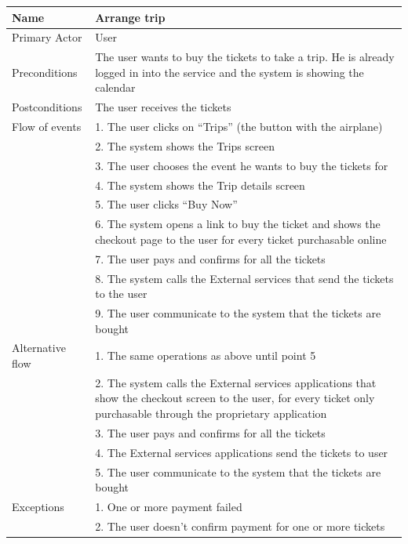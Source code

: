 \begin{center}
\def\arraystretch{1.25}
  \begin{tabular}{ | l | p{} | }
    \hline
    Name & Arrange trip \\ \hline
    Primary Actor & User \\ \hline
    Preconditions & The user wants to buy the tickets to take a trip. He is already logged in into the service and the system is showing the calendar \\ \hline
    Postconditions & The user receives the tickets \\ \hline
    Flow of events  & 1.	The user clicks on “Trips” (the button with the airplane) \\
					& 2.	The system shows the Trips screen \\
					& 3.	The user chooses the event he wants to buy the tickets for \\
					& 4.	The system shows the Trip details screen \\
					& 5.	The user clicks “Buy Now” \\
					& 6.	The system opens a link to buy the ticket and shows the checkout page to the user for every ticket purchasable online \\
					& 7.	The user pays and confirms for all the tickets \\
					& 8.	The system calls the External services that send the tickets to the user  \\
					& 9.	The user communicate to the system that the tickets are bought \\
 \hline    
 	Alternative flow    & 1.	The same operations as above until point 5 \\
						& 2.	The system calls the External services applications that show the checkout screen to the user, for every ticket only purchasable through the proprietary application \\
						& 3.	The user pays and confirms for all the tickets \\
						& 4.	The External services applications send the tickets to user \\
						& 5.	The user communicate to the system that the tickets are bought \\
 \hline
    Exceptions  & 1.	One or more payment failed \\
				& 2.	The user doesn’t confirm payment for one or more tickets \\
 \hline
  \end{tabular}
\end{center}

